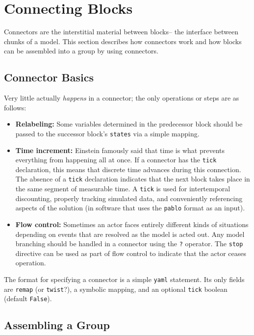 \documentclass[12pt,pdftex,letterpaper]{article}
\begin{document}
\section{Connecting Blocks}

Connectors are the interstitial material between blocks-- the interface between chunks of a model. This section describes how connectors work and how blocks can be assembled into a group by using connectors.


\subsection{Connector Basics}

Very little actually \textit{happens} in a connector; the only operations or steps are as follows:

\begin{itemize}
	\item \textbf{Relabeling:} Some variables determined in the predecessor block should be passed to the successor block's \texttt{states} via a simple mapping.
	
	\item \textbf{Time increment:} Einstein famously said that time is what prevents everything from happening all at once. If a connector has the \texttt{tick} declaration, this means that discrete time advances during this connection. The absence of a \texttt{tick} declaration indicates that the next block takes place in the same segment of measurable time. A \texttt{tick} is used for intertemporal discounting, properly tracking simulated data, and conveniently referencing aspects of the solution (in software that uses the \texttt{pablo} format as an input).
	
	\item \textbf{Flow control:} Sometimes an actor faces entirely different kinds of situations depending on events that are resolved as the model is acted out. Any model branching should be handled in a connector using the \texttt{?} operator. The \texttt{stop} directive can be used as part of flow control to indicate that the actor ceases operation.
\end{itemize}

The format for specifying a connector is a simple \texttt{yaml} statement. Its only fields are \texttt{remap} (or \texttt{twist}?), a symbolic mapping, and an optional \texttt{tick} boolean (default \texttt{False}).


\subsection{Assembling a Group}
\end{document}
